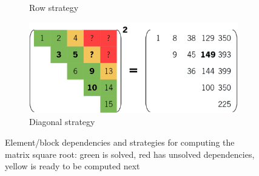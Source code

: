 \documentclass[../thesis]{subfiles}
\begin{document}
\begin{figure}[htp]
\begin{subfigure}{\textwidth}
			\caption{Row strategy}
		\end{subfigure}
		\begin{subfigure}{\textwidth}
			\centering
			\includegraphics[height=0.16\textheight]{assets/images/case/diagonal.png}
			\caption{Diagonal strategy}
		\end{subfigure}
		\addtolength\belowcaptionskip{-0.5cm}
		\caption[Element/block dependencies and strategies for computing the matrix square root]{Element/block dependencies and strategies for computing the matrix square root: green is solved, red has unsolved dependencies, yellow is ready to be computed next}
	\end{figure}
\end{document}
